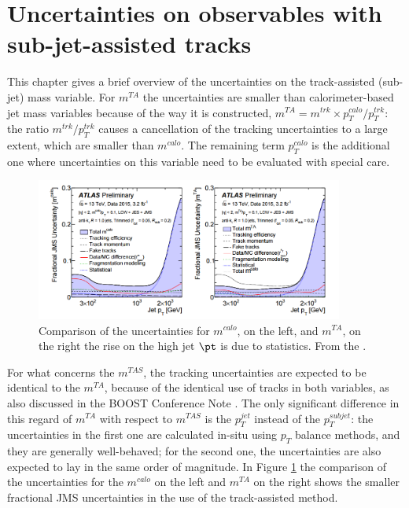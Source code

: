 \documentclass[UKenglish,texlive=2013]{\ATLASLATEXPATH atlasdoc}
\newcommand{\mta}{m^{TA}}
\newcommand{\mtas}{m^{TAS}}
\newcommand{\mcal}{m^{calo}}
\begin{document}
\label{sec:ECFnS}

\clearpage
\section{Uncertainties on observables with sub-jet-assisted tracks}
This chapter gives a brief overview of the uncertainties on the track-assisted (sub-jet) mass variable. 
For $\mta$ the uncertainties are smaller than calorimeter-based jet mass variables because of the way it is constructed, $\mta=m^{trk}\times p_T^{calo}/p_T^{trk}$: the ratio $m^{trk}/p_T^{trk}$ causes a cancellation of the tracking uncertainties to a large extent, which are smaller than $\mcal$. The remaining term $p_T^{calo}$ is the additional one where uncertainties on this variable need to be evaluated with special care.

\begin{figure}[!ht]
  \centering
      \includegraphics[width=0.9\textwidth]{jet_part/uncert.png}
  \caption[Comparison of the uncertainties for $\mcal$ and $\mta$]{Comparison of the uncertainties for $\mcal$, on the left, and $\mta$, on the right the rise on the high jet $\pt$ is due to statistics. From the \cite{art35}.}
  \label{fig:uncert}
\end{figure}


For what concerns the $\mtas$, the tracking uncertainties are expected to be identical to the $\mta$, because of the identical use of tracks in both variables, as also discussed in the BOOST Conference Note \cite{art35}.
The only significant difference in this regard of $\mta$ with respect to $\mtas$ is the $p_T^{jet}$ instead of the $p_T^{subjet}$: the uncertainties in the first one are calculated in-situ using $p_T$ balance methods, and they are generally well-behaved; for the second one, the uncertainties are also expected to lay in the same order of magnitude. In Figure \ref{fig:uncert} the comparison of the uncertainties for the $\mcal$ on the left and $\mta$ on the right shows the smaller fractional JMS uncertainties in the use of the track-assisted method.
\end{document}
